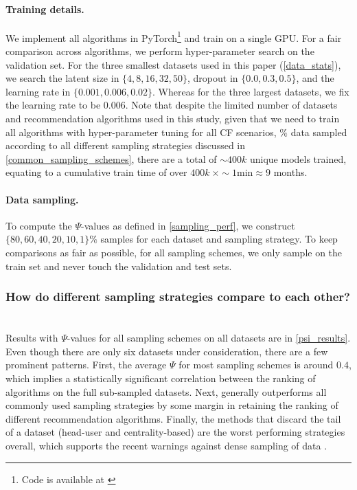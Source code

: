 \paragraph{Training details.} We implement all algorithms in PyTorch\footnote{Code is available at \href{https://github.com/noveens/sampling_cf}{\color{blue}{https://github.com/noveens/sampling\_cf}}} 
and train on a single GPU. For a fair comparison across algorithms, we perform 
hyper-parameter search on the validation set. 
For the three smallest datasets used in this paper (\cref{data_stats}), we search the latent size in $\{ 4, 8, 16, 32, 50 \}$, dropout in $\{ 0.0, 0.3, 0.5 \}$, and the learning rate in $\{ 0.001, 0.006, 0.02 \}$. Whereas for the three largest datasets, we fix the learning rate to be $0.006$. %
Note that despite the limited number of datasets and recommendation algorithms used in this study, given that we need to train all algorithms with hyper-parameter tuning for all CF scenarios, $\%$ data sampled according to all different sampling strategies discussed in \cref{common_sampling_schemes}, there are a total of 
$\sim400k$ 
unique models trained, 
equating to
a cumulative train time of over $400k ~ \times \sim1 \text{min} \approx 9$ months.

\paragraph{Data sampling.} To compute the $\Psi$-values as defined in \cref{sampling_perf}, we construct $\{ 80, 60, 40, 20, 10, 1 \} \%$ samples for each dataset and sampling strategy. To keep comparisons as fair as possible, for all sampling schemes, we only sample on the train set and never touch the validation and test sets. %

\subsubsection{How do different sampling strategies compare to each other? \ \ } Results with $\Psi$-values for all sampling schemes on all datasets are in \cref{psi_results}. Even though there are only six datasets under consideration, there are a few prominent patterns. First, the average $\Psi$ for most sampling schemes is around $0.4$, which implies a statistically significant correlation between the ranking of algorithms on the full \vs sub-sampled datasets. Next, \sampler generally outperforms all commonly used sampling strategies by some margin in retaining the ranking of different recommendation algorithms. Finally, the methods that discard the tail of a dataset (head-user and centrality-based) are the worst performing strategies overall, which supports the recent warnings against dense sampling of data \cite{sigir20}.

